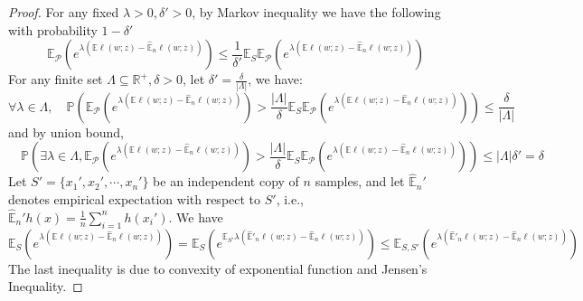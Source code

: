 \documentclass[final,12pt]{colt2018} %
\begin{document}
\begin{proof}
For any fixed $\lambda>0,\delta'>0$, by Markov inequality we have the following with probability $1-\delta'$
\begin{equation}
	\mathbb{E}_{\mathcal{P}}\left(e^{\lambda\left(\mathbb{E}\ell(w;z)-\hat{\mathbb{E}}_n \ell(w;z)\right)}\right)\leq \frac{1}{\delta'}\mathbb{E}_{S}\mathbb{E}_{\mathcal{P}}\left(e^{\lambda\left(\mathbb{E}\ell(w;z)-\hat{\mathbb{E}}_n \ell(w;z)\right)}\right)
\end{equation}
For any finite set $\Lambda\subseteq \mathbb{R}^+,\delta>0$, let $\delta'=\frac{\delta}{|\Lambda|}$, we have:
\begin{equation}\label{union-bound-ineq}
	\forall \lambda\in\Lambda,\quad\mathbb{P}\left(\mathbb{E}_{\mathcal{P}}\left(e^{\lambda\left(\mathbb{E}\ell(w;z)-\hat{\mathbb{E}}_n \ell(w;z)\right)}\right)> \frac{|\Lambda|}{\delta}\mathbb{E}_{S}\mathbb{E}_{\mathcal{P}}\left(e^{\lambda\left(\mathbb{E}\ell(w;z)-\hat{\mathbb{E}}_n \ell(w;z)\right)}\right)\right)\leq \frac{\delta}{|\Lambda|}
\end{equation}
 and by union bound,
\begin{equation}
	\quad\mathbb{P}\left(\exists \lambda\in \Lambda,\mathbb{E}_{\mathcal{P}}\left(e^{\lambda\left(\mathbb{E}\ell(w;z)-\hat{\mathbb{E}}_n \ell(w;z)\right)}\right)> \frac{|\Lambda|}{\delta}\mathbb{E}_{S}\mathbb{E}_{\mathcal{P}}\left(e^{\lambda\left(\mathbb{E}\ell(w;z)-\hat{\mathbb{E}}_n \ell(w;z)\right)}\right)\right)\leq |\Lambda|\delta'=\delta
\end{equation}
Let $S'=\{x_1',x_2',\cdots,x_n'\}$ be an independent copy of $n$ samples, and let $\hat{\mathbb{E}}_n'$ denotes empirical expectation with respect to $S'$, i.e., $\hat{\mathbb{E}}_n' h(x)=\frac{1}{n}\sum_{i=1}^n h(x_i')$. We have
\begin{equation}
\mathbb{E}_{S}\left(e^{\lambda\left(\mathbb{E}\ell(w;z)-\hat{\mathbb{E}}_n \ell(w;z)\right)}\right)=\mathbb{E}_{S}\left(e^{\mathbb{E}_{S'}\lambda\left(\hat{\mathbb{E}}'_n \ell(w;z)-\hat{\mathbb{E}}_n\ell(w;z)\right)}\right)\leq \mathbb{E}_{S,S'}\left(e^{\lambda\left(\hat{\mathbb{E}}'_n \ell(w;z)-\hat{\mathbb{E}}_n\ell(w;z)\right)}\right)
\end{equation}
The last inequality is due to convexity of exponential function and Jensen's Inequality.


\end{proof}
\end{document}
